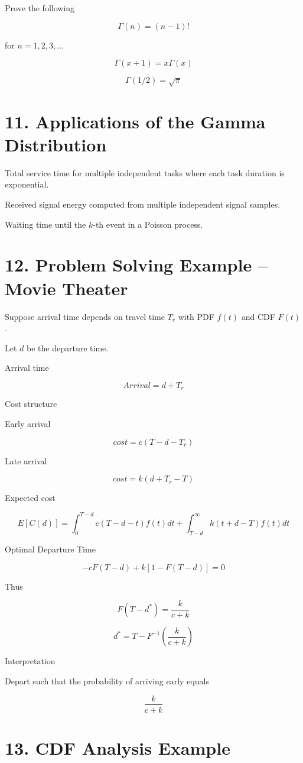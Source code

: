 \documentclass[12pt]{article}
\begin{document}
Prove the following

\[
\Gamma(n)=(n-1)!
\]

for $n=1,2,3,...$

\[
\Gamma(x+1)=x\Gamma(x)
\]

\[
\Gamma(1/2)=\sqrt{\pi}
\]

\section*{11. Applications of the Gamma Distribution}

Total service time for multiple independent tasks where each task duration is exponential.

Received signal energy computed from multiple independent signal samples.

Waiting time until the $k$-th event in a Poisson process.

\section*{12. Problem Solving Example – Movie Theater}

Suppose arrival time depends on travel time $T_r$ with PDF $f(t)$ and CDF $F(t)$.

Let $d$ be the departure time.

Arrival time

\[
Arrival=d+T_r
\]

Cost structure

Early arrival

\[
cost=c(T-d-T_r)
\]

Late arrival

\[
cost=k(d+T_r-T)
\]

Expected cost

\[
E[C(d)]=
\int_0^{T-d}c(T-d-t)f(t)dt
+
\int_{T-d}^{\infty}k(t+d-T)f(t)dt
\]

Optimal Departure Time

\[
-cF(T-d)+k[1-F(T-d)]=0
\]

Thus

\[
F(T-d^*)=\frac{k}{c+k}
\]

\[
d^*=T-F^{-1}\left(\frac{k}{c+k}\right)
\]

Interpretation

Depart such that the probability of arriving early equals

\[
\frac{k}{c+k}
\]

\section*{13. CDF Analysis Example}
\end{document}
